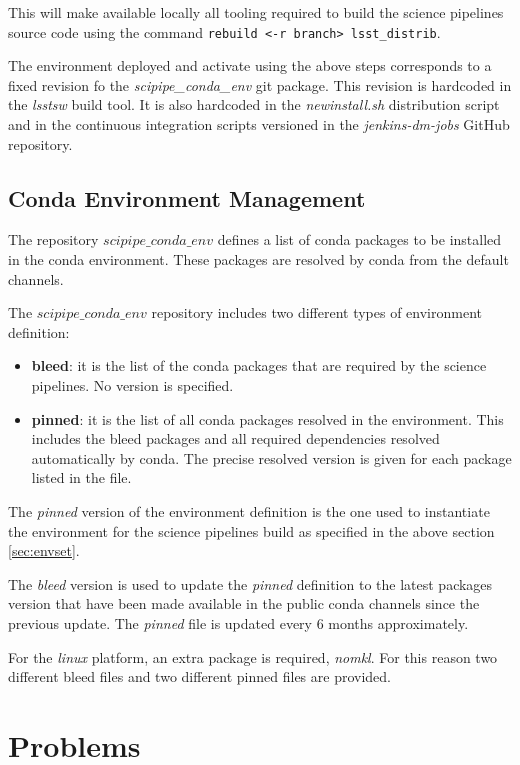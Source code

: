 This will make available locally all tooling required to build the science pipelines source code using the command \texttt{rebuild <-r branch> lsst\_distrib}.

The environment deployed and activate using the above steps corresponds to a fixed revision fo the \textit{scipipe\_conda\_env} git package.
This revision is hardcoded in the \textit{lsstsw} build tool. It is also hardcoded in the \textit{newinstall.sh} distribution script and in the continuous integration scripts versioned in the \textit{jenkins-dm-jobs} GitHub repository.


\subsection{Conda Environment Management} \label{sec:condaenv}

The repository $scipipe\_conda\_env$ defines a list of conda packages to be installed in the conda environment.
These packages are resolved by conda from the default channels.

The $scipipe\_conda\_env$ repository includes two different types of environment definition:

\begin{itemize}
\item {\bf bleed}: it is the list of the conda packages that are required by the science pipelines. No version is specified.
\item {\bf pinned}: it is the list of all conda packages resolved in the environment. This includes the bleed packages and all required dependencies resolved automatically by conda. The precise resolved version is given for each package listed in the file.
\end{itemize}

The \textit{pinned} version of the environment definition is the one used to instantiate the environment for the science pipelines build as specified in the above section \ref{sec:envset}.

The \textit{bleed} version is used to update the \textit{pinned} definition to the latest packages version that have been made available in the public conda channels since the previous update.
The \textit{pinned} file is updated every 6 months approximately.

For the \textit{linux} platform, an extra package is required, \textit{nomkl}. For this reason two different bleed files and two different pinned files are provided.


\newpage
\section{Problems}

